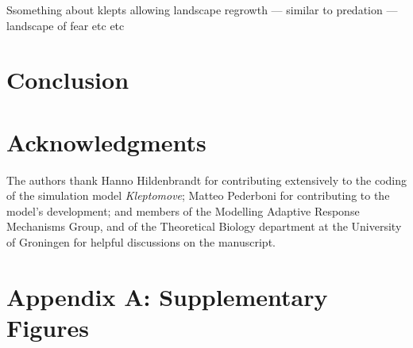 \documentclass[11pt]{article}
\begin{document}
Ssomething about klepts allowing landscape regrowth --- similar to predation --- landscape of fear etc etc


\section{Conclusion}



\section{Acknowledgments}

The authors thank Hanno Hildenbrandt for contributing extensively to the coding of the simulation model \textit{Kleptomove};
Matteo Pederboni for contributing to the model's development; 
and members of the Modelling Adaptive Response Mechanisms Group, and of the Theoretical Biology department at the University of Groningen for helpful discussions on the manuscript.



\newpage{}

\section{Appendix A: Supplementary Figures}

%
%
%
%
%
\end{document}
